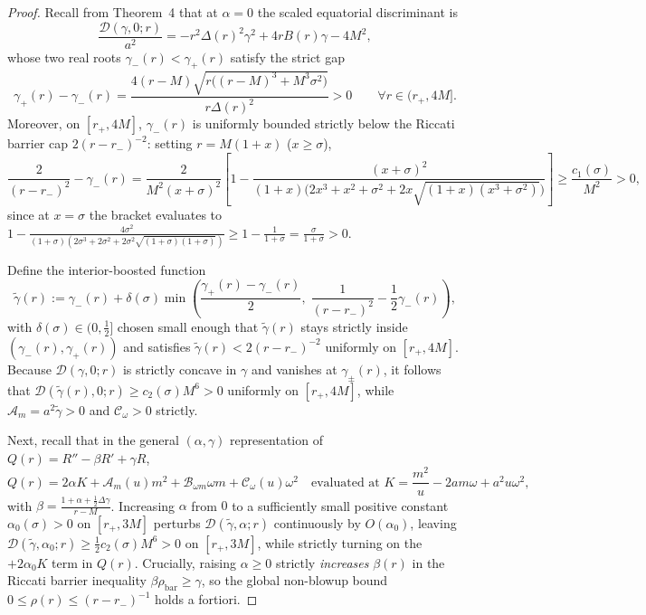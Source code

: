 \documentclass[11pt, a4paper]{article}
\theoremstyle{remark}
\begin{document}
\begin{proof}
Recall from Theorem~4 that at $\alpha = 0$ the scaled equatorial discriminant is
\begin{equation}
\frac{\mathcal{D}(\gamma, 0; r)}{a^2} = -r^2\Delta(r)^2\gamma^2 + 4r B(r)\gamma - 4M^2,
\end{equation}
whose two real roots $\gamma_-(r) < \gamma_+(r)$ satisfy the strict gap
\begin{equation}
\gamma_+(r) - \gamma_-(r) = \frac{4(r - M)\sqrt{r\big((r - M)^3 + M^3\sigma^2\big)}}{r\Delta(r)^2} > 0 \qquad \forall r \in (r_+, 4M].
\end{equation}
Moreover, on $[r_+, 4M]$, $\gamma_-(r)$ is uniformly bounded strictly below the Riccati barrier cap $2(r - r_-)^{-2}$: setting $r = M(1 + x)$ ($x \ge \sigma$),
\begin{equation}
\frac{2}{(r - r_-)^2} - \gamma_-(r) = \frac{2}{M^2(x + \sigma)^2}\left[1 - \frac{(x + \sigma)^2}{(1 + x)\big(2x^3 + x^2 + \sigma^2 + 2x\sqrt{(1+x)(x^3+\sigma^2)}\big)}\right] \ge \frac{c_1(\sigma)}{M^2} > 0,
\end{equation}
since at $x = \sigma$ the bracket evaluates to $1 - \frac{4\sigma^2}{(1+\sigma)(2\sigma^3 + 2\sigma^2 + 2\sigma^2\sqrt{(1+\sigma)(1+\sigma)})} \ge 1 - \frac{1}{1+\sigma} = \frac{\sigma}{1+\sigma} > 0$.

Define the interior-boosted function
\begin{equation}
\widetilde{\gamma}(r) := \gamma_-(r) + \delta(\sigma)\min\!\left(\frac{\gamma_+(r) - \gamma_-(r)}{2},\; \frac{1}{(r - r_-)^2} - \frac{1}{2}\gamma_-(r)\right),
\end{equation}
with $\delta(\sigma) \in (0, \frac{1}{2}]$ chosen small enough that $\widetilde{\gamma}(r)$ stays strictly inside $(\gamma_-(r), \gamma_+(r))$ and satisfies $\widetilde{\gamma}(r) < 2(r - r_-)^{-2}$ uniformly on $[r_+, 4M]$. Because $\mathcal{D}(\gamma, 0; r)$ is strictly concave in $\gamma$ and vanishes at $\gamma_\pm(r)$, it follows that $\mathcal{D}(\widetilde{\gamma}(r), 0; r) \ge c_2(\sigma) M^6 > 0$ uniformly on $[r_+, 4M]$, while $\mathcal{A}_m = a^2\widetilde{\gamma} > 0$ and $\mathcal{C}_\omega > 0$ strictly.

Next, recall that in the general $(\alpha, \gamma)$ representation of $Q(r) = R'' - \beta R' + \gamma R$,
\begin{equation}
Q(r) = 2\alpha K + \mathcal{A}_m(u)m^2 + \mathcal{B}_{\omega m}\omega m + \mathcal{C}_\omega(u)\omega^2 \quad \text{evaluated at } K = \frac{m^2}{u} - 2am\omega + a^2 u\omega^2,
\end{equation}
with $\beta = \frac{1 + \alpha + \frac{1}{2}\Delta\gamma}{r - M}$. Increasing $\alpha$ from $0$ to a sufficiently small positive constant $\alpha_0(\sigma) > 0$ on $[r_+, 3M]$ perturbs $\mathcal{D}(\widetilde{\gamma}, \alpha; r)$ continuously by $O(\alpha_0)$, leaving $\mathcal{D}(\widetilde{\gamma}, \alpha_0; r) \ge \frac{1}{2}c_2(\sigma)M^6 > 0$ on $[r_+, 3M]$, while strictly turning on the $+2\alpha_0 K$ term in $Q(r)$. Crucially, raising $\alpha \ge 0$ strictly \emph{increases} $\beta(r)$ in the Riccati barrier inequality $\beta\rho_{\mathrm{bar}} \ge \gamma$, so the global non-blowup bound $0 \le \rho(r) \le (r - r_-)^{-1}$ holds a fortiori.


\end{proof}
\end{document}
